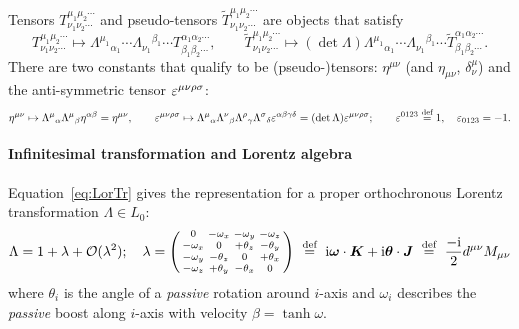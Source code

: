 \documentclass[CheatSheet]{subfiles}
\newcommand{\LorTr}[2]{\Lambda^{#1}{}_{#2}}
\newcommand\defeq{\mathrel{\stackrel{\text{def}}=}}
\begin{document}
Tensors $T^{\mu_1\mu_2\cdots}_{\nu_1\nu_2\cdots}$ and pseudo-tensors $\tilde T^{\mu_1\mu_2\cdots}_{\nu_1\nu_2\cdots}$ are objects that satisfy
\begin{equation}
 T^{\mu_1\mu_2\cdots}_{\nu_1\nu_2\cdots}\mapsto
\LorTr{\mu_1}{\alpha_1}\cdots
\Lambda_{\nu_1}{}^{\beta_1}\cdots
 T^{\alpha_1\alpha_2\cdots}_{\beta_1\beta_2\cdots},
\qquad
 \tilde T^{\mu_1\mu_2\cdots}_{\nu_1\nu_2\cdots}\mapsto(\det\Lambda)
\LorTr{\mu_1}{\alpha_1}\cdots
\Lambda_{\nu_1}{}^{\beta_1}\cdots
 \tilde T^{\alpha_1\alpha_2\cdots}_{\beta_1\beta_2\cdots}.
\end{equation}
There are two constants that qualify to be (pseudo-)tensors: $\eta^{\mu\nu}$ (and $\eta_{\mu\nu}$, $\delta^{\mu}_\nu$) and the anti-symmetric tensor $\varepsilon^{\mu\nu\rho\sigma}$:
\begin{equation}
\eta^{\mu\nu}\mapsto \LorTr\mu\alpha\LorTr\mu\beta\eta^{\alpha\beta}=\eta^{\mu\nu},\qquad
 \vep^{\mu\nu\rho\sigma}\mapsto \LorTr\mu\alpha\LorTr\nu\beta\LorTr\rho\gamma\LorTr\sigma\delta\vep^{\alpha\beta\gamma\delta}=(\det\Lambda)\vep^{\mu\nu\rho\sigma};\qquad
 \vep^{0123}\defeq1,\quad \vep_{0123}=-1.
\end{equation}

\paragraph{Infinitesimal transformation and Lorentz algebra}
Equation~\eqref{eq:LorTr} gives the representation for a proper orthochronous Lorentz transformation $\Lambda\in L_0$:
\begin{equation}
 \Lambda= 1 + \lambda + \Order(\lambda^2);\quad
\lambda=\spmat{
 0 & -\omega_x & -\omega_y & -\omega_z \\
 -\omega_x & 0        &+\theta_z &-\theta_y\\
 -\omega_y &-\theta_z & 0        &+\theta_x\\
 -\omega_z &+\theta_y &-\theta_x & 0
}
~\defeq~
\ii\vc{\omega}\cdot\vc K+\ii\vc\theta\cdot\vc J
~\defeq~
\frac{-\ii}{2}d^{\mu\nu}M_{\mu\nu}
\label{eq:LorTrInf}
\end{equation}
where $\theta_i$ is the angle of a \emph{passive} rotation around $i$-axis and $\omega_i$ describes the \emph{passive} boost along $i$-axis with velocity $\beta=\tanh\omega$.
\end{document}
